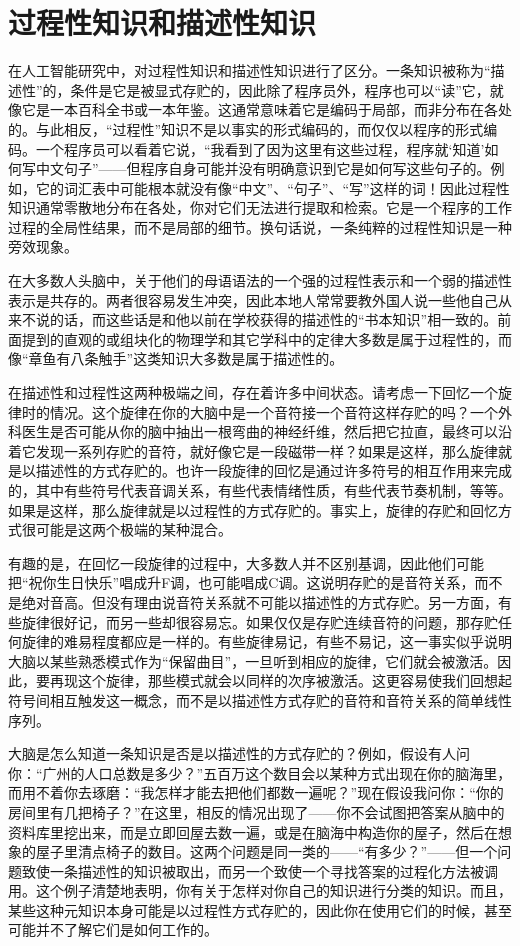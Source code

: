 \section{过程性知识和描述性知识}

在人工智能研究中，对过程性知识和描述性知识进行了区分。一条知识被称为“描述性”的，条件是它是被显式存贮的，因此除了程序员外，程序也可以“读”它，就像它是一本百科全书或一本年鉴。这通常意味着它是编码于局部，而非分布在各处的。与此相反，“过程性”知识不是以事实的形式编码的，而仅仅以程序的形式编码。一个程序员可以看着它说，“我看到了因为这里有这些过程，程序就‘知道’如何写中文句子”——但程序自身可能并没有明确意识到它是如何写这些句子的。例如，它的词汇表中可能根本就没有像“中文”、“句子”、“写”这样的词！因此过程性知识通常零散地分布在各处，你对它们无法进行提取和检索。它是一个程序的工作过程的全局性结果，而不是局部的细节。换句话说，一条纯粹的过程性知识是一种旁效现象。

在大多数人头脑中，关于他们的母语语法的一个强的过程性表示和一个弱的描述性表示是共存的。两者很容易发生冲突，因此本地人常常要教外国人说一些他自己从来不说的话，而这些话是和他以前在学校获得的描述性的“书本知识”相一致的。前面提到的直观的或组块化的物理学和其它学科中的定律大多数是属于过程性的，而像“章鱼有八条触手”这类知识大多数是属于描述性的。

在描述性和过程性这两种极端之间，存在着许多中间状态。请考虑一下回忆一个旋律时的情况。这个旋律在你的大脑中是一个音符接一个音符这样存贮的吗？一个外科医生是否可能从你的脑中抽出一根弯曲的神经纤维，然后把它拉直，最终可以沿着它发现一系列存贮的音符，就好像它是一段磁带一样？如果是这样，那么旋律就是以描述性的方式存贮的。也许一段旋律的回忆是通过许多符号的相互作用来完成的，其中有些符号代表音调关系，有些代表情绪性质，有些代表节奏机制，等等。如果是这样，那么旋律就是以过程性的方式存贮的。事实上，旋律的存贮和回忆方式很可能是这两个极端的某种混合。

有趣的是，在回忆一段旋律的过程中，大多数人并不区别基调，因此他们可能把“祝你生日快乐”唱成升F调，也可能唱成C调。这说明存贮的是音符关系，而不是绝对音高。但没有理由说音符关系就不可能以描述性的方式存贮。另一方面，有些旋律很好记，而另一些却很容易忘。如果仅仅是存贮连续音符的问题，那存贮任何旋律的难易程度都应是一样的。有些旋律易记，有些不易记，这一事实似乎说明大脑以某些熟悉模式作为“保留曲目”，一旦听到相应的旋律，它们就会被激活。因此，要再现这个旋律，那些模式就会以同样的次序被激活。这更容易使我们回想起符号间相互触发这一概念，而不是以描述性方式存贮的音符和音符关系的简单线性序列。

大脑是怎么知道一条知识是否是以描述性的方式存贮的？例如，假设有人问你：“广州的人口总数是多少？”五百万这个数目会以某种方式出现在你的脑海里，而用不着你去琢磨：“我怎样才能去把他们都数一遍呢？”现在假设我问你：“你的房间里有几把椅子？”在这里，相反的情况出现了——你不会试图把答案从脑中的资料库里挖出来，而是立即回屋去数一遍，或是在脑海中构造你的屋子，然后在想象的屋子里清点椅子的数目。这两个问题是同一类的——“有多少？”——但一个问题致使一条描述性的知识被取出，而另一个致使一个寻找答案的过程化方法被调用。这个例子清楚地表明，你有关于怎样对你自己的知识进行分类的知识。而且，某些这种元知识本身可能是以过程性方式存贮的，因此你在使用它们的时候，甚至可能并不了解它们是如何工作的。

